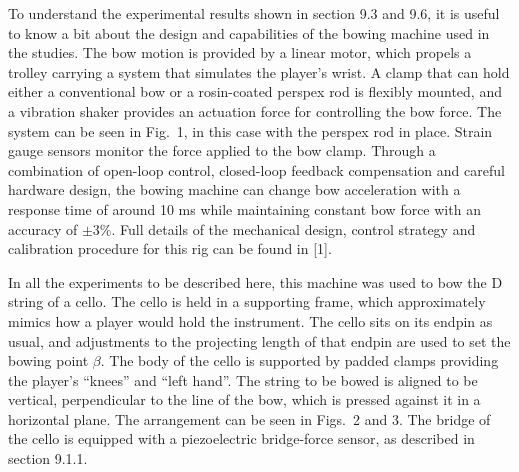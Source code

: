   To understand the experimental results shown in section 9.3 and 9.6, it is 
  useful to know a bit about the design and capabilities of the bowing machine 
  used in the studies. The bow motion is provided by a linear motor, which 
  propels a trolley carrying a system that simulates the player’s wrist. A 
  clamp that can hold either a conventional bow or a rosin-coated perspex rod 
  is flexibly mounted, and a vibration shaker provides an actuation force for 
  controlling the bow force. The system can be seen in Fig.\ 1, in this case 
  with the perspex rod in place. Strain gauge sensors monitor the force applied 
  to the bow clamp. Through a combination of open-loop control, closed-loop 
  feedback compensation and careful hardware design, the bowing machine can 
  change bow acceleration with a response time of around 10 ms while 
  maintaining constant bow force with an accuracy of $\pm3 \%$. Full details of 
  the mechanical design, control strategy and calibration procedure for this 
  rig can be found in [1]. 


  In all the experiments to be described here, this machine was used to bow the 
  D string of a cello. The cello is held in a supporting frame, which 
  approximately mimics how a player would hold the instrument. The cello sits 
  on its endpin as usual, and adjustments to the projecting length of that 
  endpin are used to set the bowing point $\beta$. The body of the cello is 
  supported by padded clamps providing the player’s “knees” and “left hand”. 
  The string to be bowed is aligned to be vertical, perpendicular to the line 
  of the bow, which is pressed against it in a horizontal plane. The 
  arrangement can be seen in Figs.\ 2 and 3. The bridge of the cello is 
  equipped with a piezoelectric bridge-force sensor, as described in section 
  9.1.1. 



